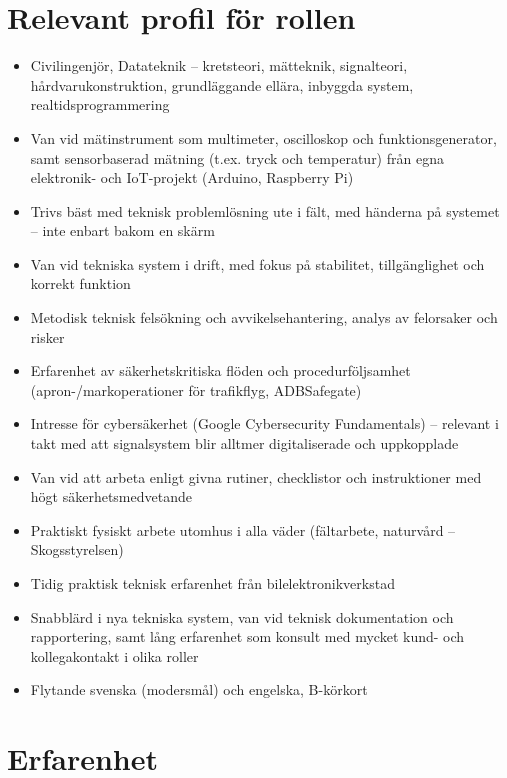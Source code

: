 \documentclass[11pt,a4paper,sans]{moderncv}
\begin{document}
\section*{Relevant profil för rollen}
\begin{itemize}[nosep]
  \item Civilingenjör, Datateknik -- kretsteori, mätteknik, signalteori, hårdvarukonstruktion, grundläggande ellära, inbyggda system, realtidsprogrammering
  \item Van vid mätinstrument som multimeter, oscilloskop och funktionsgenerator, samt sensorbaserad mätning (t.ex. tryck och temperatur) från egna elektronik- och IoT-projekt (Arduino, Raspberry Pi)
  \item Trivs bäst med teknisk problemlösning ute i fält, med händerna på systemet -- inte enbart bakom en skärm
  \item Van vid tekniska system i drift, med fokus på stabilitet, tillgänglighet och korrekt funktion
  \item Metodisk teknisk felsökning och avvikelsehantering, analys av felorsaker och risker
  \item Erfarenhet av säkerhetskritiska flöden och procedurföljsamhet (apron-/markoperationer för trafikflyg, ADBSafegate)
  \item Intresse för cybersäkerhet (Google Cybersecurity Fundamentals) -- relevant i takt med att signalsystem blir alltmer digitaliserade och uppkopplade
  \item Van vid att arbeta enligt givna rutiner, checklistor och instruktioner med högt säkerhetsmedvetande
  \item Praktiskt fysiskt arbete utomhus i alla väder (fältarbete, naturvård -- Skogsstyrelsen)
  \item Tidig praktisk teknisk erfarenhet från bilelektronikverkstad
  \item Snabblärd i nya tekniska system, van vid teknisk dokumentation och rapportering, samt lång erfarenhet som konsult med mycket kund- och kollegakontakt i olika roller
  \item Flytande svenska (modersmål) och engelska, B-körkort
\end{itemize}

\section{Erfarenhet}

\end{document}
